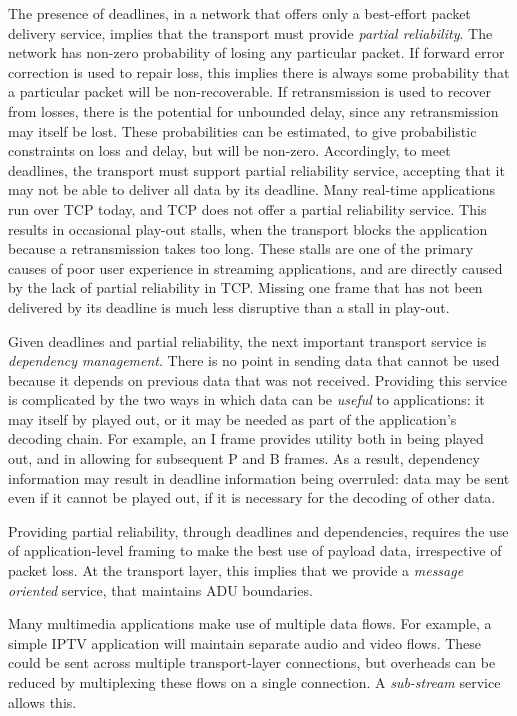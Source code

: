 \documentclass[10pt]{sig-alternate-05-2015}
\begin{document}
The presence of deadlines, in a network that offers only a best-effort
packet delivery service, implies that the transport must provide
\emph{partial reliability}.
The network has non-zero probability of losing any particular packet.
If forward error correction is used to repair loss, this implies there is
always some probability that a particular packet will be non-recoverable.
If retransmission is used to recover from losses, there is the potential
for unbounded delay, since any retransmission may itself be lost.
These probabilities can be estimated, to give probabilistic constraints
on loss and delay, but will be non-zero. Accordingly, to meet deadlines,
the transport must support partial reliability service, accepting that
it may not be able to deliver all data by its deadline.
Many real-time applications run over TCP today, and TCP does not offer a
partial reliability service. This results in occasional play-out stalls,
when the transport blocks the application because a retransmission takes
too long. These stalls are one of the primary causes of poor user
experience in streaming applications, and are directly caused by the lack
of partial reliability in TCP. Missing one frame that has not been
delivered by its deadline is much less disruptive than a stall in play-out.

Given deadlines and partial reliability, the next important transport
service is \emph{dependency management}. There is no point in sending data
that cannot be used because it depends on previous data that was not
received. Providing this service is complicated by the two ways in which
data can be \emph{useful} to applications: it may itself by played out, or
it may be needed as part of the application's decoding chain. For example,
an I frame provides utility both in being played out, and in allowing for
subsequent P and B frames. As a result, dependency information may result
in deadline information being overruled: data may be sent even if it cannot
be played out, if it is necessary for the decoding of other data.

Providing partial reliability, through deadlines and dependencies, requires
the use of application-level framing \cite{clark:1990:architecture} to
make the best use of payload data, irrespective of packet loss. At the
transport layer, this implies that we provide a \emph{message oriented}
service, that maintains ADU boundaries.

Many multimedia applications make use of multiple data flows. For example,
a simple IPTV application will maintain separate audio and video flows.
These could be sent across multiple transport-layer connections, but
overheads can be reduced by multiplexing these flows on a single
connection. A \emph{sub-stream} service allows this.
\end{document}
